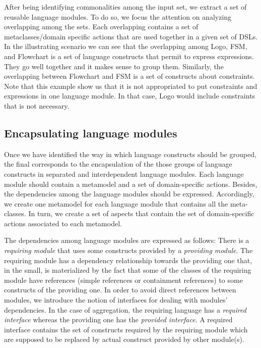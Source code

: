After being identifying commonalities among the input set, we extract a set of reusable language modules. To do so, we focus the attention on analyzing overlapping among the sets. Each overlapping contains a set of metaclasses/domain specific actions that are used together in a given set of DSLs. In the illustrating scenario we can see that the overlapping among Logo, FSM, and Flowchart is a set of language constructs that permit to express expressions. They go well together and it makes sense to group them. Similarly, the overlapping between Flowchart and FSM is a set of constructs about constraints. Note that this example show us that it is not appropriated to put constraints and expressions in one language module. In that case, Logo would include constraints that is not necessary. 

\subsection{Encapsulating language modules}

Once we have identified the way in which language constructs should be grouped, the final corresponds to the encapsulation of the those groups of language constructs in separated and interdependent language modules.
Each language module should contain a metamodel and a set of domain-specific actions. Besides, the dependencies among the language modules should be expressed. Accordingly, we create one metamodel for each language module that contains all the meta-classes. In turn, we create a set of aspects that contain the set of domain-specific actions associated to each metamodel.

The dependencies among language modules are expressed as follows: There is a \textit{requiring module} that uses some constructs provided by a \textit{providing module}. The requiring module has a dependency relationship towards the providing one that, in the small, is materialized by the fact that some of the classes of the requiring module have references (simple references or containment references) to some constructs of the providing one. In order to avoid direct references between modules, we introduce the notion of interfaces for dealing with modules' dependencies. In the case of aggregation, the requiring language has a \textit{required interface} whereas the providing one has the \textit{provided interface}. A required interface contains the set of constructs required by the requiring module which are supposed to be replaced by actual construct provided by other module(s).

